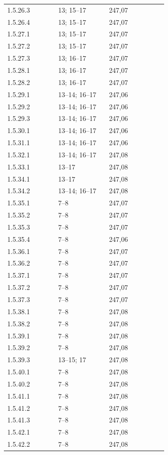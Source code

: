 \documentclass[11pt]{article}
\begin{document}
\begin{longtable}{@{}p{0.29\linewidth}p{0.29\linewidth}p{0.32\linewidth}@{}}
1.5.26.3 & 13; 15--17 & 247,07 \\
1.5.26.4 & 13; 15--17 & 247,07 \\
1.5.27.1 & 13; 15--17 & 247,07 \\
1.5.27.2 & 13; 15--17 & 247,07 \\
1.5.27.3 & 13; 16--17 & 247,07 \\
1.5.28.1 & 13; 16--17 & 247,07 \\
1.5.28.2 & 13; 16--17 & 247,07 \\
1.5.29.1 & 13--14; 16--17 & 247,06 \\
1.5.29.2 & 13--14; 16--17 & 247,06 \\
1.5.29.3 & 13--14; 16--17 & 247,06 \\
1.5.30.1 & 13--14; 16--17 & 247,06 \\
1.5.31.1 & 13--14; 16--17 & 247,06 \\
1.5.32.1 & 13--14; 16--17 & 247,08 \\
1.5.33.1 & 13--17 & 247,08 \\
1.5.34.1 & 13--17 & 247,08 \\
1.5.34.2 & 13--14; 16--17 & 247,08 \\
1.5.35.1 & 7--8 & 247,07 \\
1.5.35.2 & 7--8 & 247,07 \\
1.5.35.3 & 7--8 & 247,07 \\
1.5.35.4 & 7--8 & 247,06 \\
1.5.36.1 & 7--8 & 247,07 \\
1.5.36.2 & 7--8 & 247,07 \\
1.5.37.1 & 7--8 & 247,07 \\
1.5.37.2 & 7--8 & 247,07 \\
1.5.37.3 & 7--8 & 247,07 \\
1.5.38.1 & 7--8 & 247,08 \\
1.5.38.2 & 7--8 & 247,08 \\
1.5.39.1 & 7--8 & 247,08 \\
1.5.39.2 & 7--8 & 247,08 \\
1.5.39.3 & 13--15; 17 & 247,08 \\
1.5.40.1 & 7--8 & 247,08 \\
1.5.40.2 & 7--8 & 247,08 \\
1.5.41.1 & 7--8 & 247,08 \\
1.5.41.2 & 7--8 & 247,08 \\
1.5.41.3 & 7--8 & 247,08 \\
1.5.42.1 & 7--8 & 247,08 \\
1.5.42.2 & 7--8 & 247,08 \\

\end{longtable}
\end{document}
